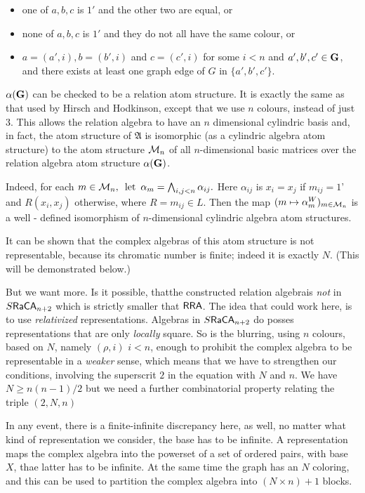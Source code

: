 \documentclass[12pt]{article}
\newcounter{item}[section]
\theoremstyle{definition}
\def\A{{\mathfrak{A}}}
\def\CA{{\sf CA}}
\def\RRA{{\bf RRA}}
\def\CA{{\sf CA}}
\def\G{{\sf G}}
\def\Ra{{\mathfrak{Ra}}}
\def\Ra{{\mathfrak{Ra}}}
\def\A{{\mathfrak{A}}}
\def\A{{\mathfrak{A}}}
\def\CA{{\sf CA}}
\def\RRA{{\sf RRA}}
\def\G{{\bf G}}
\def\Ra{{\sf Ra}}
\begin{document}
\begin{itemize}

\item one of $a,b,c$ is $1'$ and the other two are equal, or

\item none of $a,b,c$ is $1'$ and they do not all have the same colour, or

\item $a=(a', i), b=(b', i)$ and $c=(c', i)$ for some $i<n$ and 
$a',b',c'\in \G$, and there exists at least one graph edge
of $G$ in $\{a', b', c'\}$.

\end{itemize}
$\alpha(\G)$ can be checked to be a relation atom structure. It is exactly the same as that used by Hirsch and Hodkinson, except
that we use $n$ colours, instead of just $3$. This allows the relation algebra to have an $n$ dimensional cylindric basis
and, in fact, the atom structure of $\A$ is isomorphic (as a cylindric algebra
atom structure) to the atom structure ${\cal M}_n$ of all $n$-dimensional basic
matrices over the relation algebra atom structure $\alpha(\G)$.

Indeed, for each  $m  \in {\cal M}_n, \,\ \textrm{let} \,\ \alpha_m
= \bigwedge_{i,j<n}  \alpha_{ij}. $ Here $ \alpha_{ij}$ is $x_i =
x_j$ if $ m_{ij} = 1$' and $R(x_i, x_j)$ otherwise, where $R =
m_{ij} \in L$. Then the map $(m \mapsto
\alpha^W_m)_{m \in {\cal M}_n}$ is a well - defined isomorphism of
$n$-dimensional cylindric algebra atom structures.



It can be  shown that the complex algebras of this atom structure is not representable, because its chromatic number is finite; indeed
it is exactly $N$. (This will be demonstrated below.)

But we want more. Is it possible, thatthe constructed relation algebrais {\it not} in $S\Ra \CA_{n+2}$ which is strictly smaller that $\RRA$.
The idea that could work here, is to use {\it relativized} representations. 
Algebras in $S\Ra\CA_{n+2}$ do posses representations
that are only {\it locally} square.  So is the blurring, using $n$ colours, based on $N$, namely $(\rho, i)$ $i<n$,
enough to prohibit the complex algebra to be representable in a {\it weaker} sense, which means that we have to strengthen our conditions, involving
the superscrit $2$ in the equation with $N$ and $n$. We have $N\geq n(n-1)/2$ but we need a further combinatorial property relating the triple
$(2, N, n)$

In any event, there is a finite-infinite discrepancy here, as well, no matter what kind of representation we consider,
the base has to be infinite. A representation maps the complex algebra into the powerset of a set of ordered pairs, with base $X$,
thae latter has to be infinite.  At the same time the graph has an $N$ coloring, 
and this can be used to partition the complex algebra into $(N\times n)+1$ blocks. 
\end{document}
